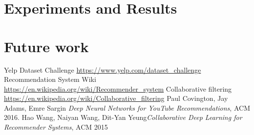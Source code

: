 \documentclass[11pt]{article}
\begin{document}
		
		
	
	\section{Experiments and Results}
	
	\section{Future work}
	
	
	\begin{thebibliography}{9}
		
	 Yelp Dataset Challenge \url{https://www.yelp.com/dataset_challenge}
	 Recommendation System Wiki \url{https://en.wikipedia.org/wiki/Recommender_system}
	Collaborative filtering \url{https://en.wikipedia.org/wiki/Collaborative_filtering}
	 Paul Covington, Jay Adams, Emre Sargin \textit{Deep Neural Networks for YouTube Recommendations}, ACM 2016.
	 Hao Wang, Naiyan Wang, Dit-Yan Yeung\textit{Collaborative Deep Learning for Recommender Systems}, ACM 2015
	\end{thebibliography}
	
	
	
	
	
	
\end{document}
